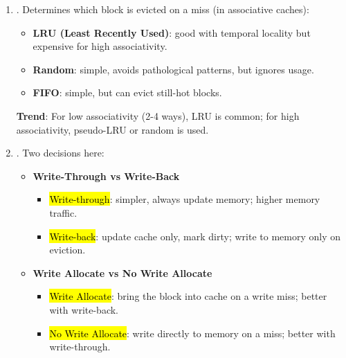 \begin{enumerate}
    \item {}. Determines which block is evicted on a miss (in associative caches):
    \begin{itemize}
        \item \textbf{LRU (Least Recently Used)}: good with temporal locality but expensive for high associativity.
        \item \textbf{Random}: simple, avoids pathological patterns, but ignores usage.
        \item \textbf{FIFO}: simple, but can evict still-hot blocks.
    \end{itemize}
    \textbf{Trend}: For low associativity (2-4 ways), LRU is common; for high associativity, pseudo-LRU or random is used.
    
    \item {}. Two decisions here:
    \begin{itemize}
        \item \textbf{Write-Through vs Write-Back}
        \begin{itemize}
            \item \hl{Write-through}: simpler, always update memory; higher memory traffic.
            \item \hl{Write-back}: update cache only, mark dirty; write to memory only on eviction.
        \end{itemize}
        \item \textbf{Write Allocate vs No Write Allocate}
        \begin{itemize}
            \item \hl{Write Allocate}: bring the block into cache on a write miss; better with write-back.
            \item \hl{No Write Allocate}: write directly to memory on a miss; better with write-through.
        \end{itemize}
    \end{itemize}
\end{enumerate}

